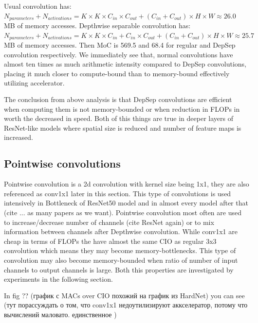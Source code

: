 
Usual convolution has: $ N_{parameters} + N_{activations} = K \times K \times C_{in} \times C_{out} + (C_{in} + C_{out}) \times H \times W \approx 26.0$ MB of memory accesses. Depthwise separable convolution has: $ N_{parameters} + N_{activations} = K \times K \times C_{in} + C_{in} \times C_{out} + (C_{in} + C_{out}) \times H \times W \approx 25.7$ MB of memory accesses. Then MoC is 569.5 and 68.4 for regular and DepSep convolution respectively. We immediately see that, normal convolutions have almost ten times as much arithmetic intensity compared to DepSep convolutions, placing it much closer to compute-bound than to memory-bound effectively utilizing accelerator. 

The conclusion from above analysis is that DepSep convolutions are efficient when computing them is not memory-bounded or when reduction in FLOPs in worth the decreased in speed. Both of this things are true in deeper layers of ResNet-like models where spatial size is reduced and number of feature maps is increased. 

\subsection{Pointwise convolutions}

Pointwise convolution is a 2d convolution with kernel size being 1x1, they are also referenced as conv1x1 later in this section. This type of convolutions is used intensively in Bottleneck of ResNet50 model and in almost every model after that (cite ... as many papers as we want). Pointwise convolution most often are used to increase/decrease number of channels (cite ResNet again) or to mix information between channels after Depthwise convolution. While conv1x1 are cheap in terms of FLOPs the have almost the same CIO as regular 3x3 convolution which means they may become memory-bottlenecks. This type of convolution may also become memory-bounded when ratio of number of input channels to output channels is large. Both this properties are investigated by experiments in the following section.

In fig ?? (график с MACs over CIO похожий на график из HardNet) you can see 
(тут порассуждать о том, что conv1x1 недоутилизируют аккселератор, потому что вычислений маловато. единственное )

